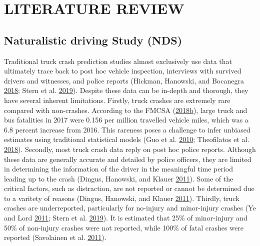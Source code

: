 \documentclass[12pt]{book}
\numberwithin{equation}{chapter}
\begin{document}
\hypertarget{literature-review}{%
\chapter{LITERATURE REVIEW}\label{literature-review}}

\hypertarget{naturalistic-driving-study-nds}{%
\section{Naturalistic driving Study (NDS)}\label{naturalistic-driving-study-nds}}

Traditional truck crash prediction studies almost exclusively use data that ultimately trace back to post hoc vehicle inspection, interviews with survived drivers and witnesses, and police reports (Hickman, Hanowski, and Bocanegra \protect\hyperlink{ref-hickman2018synthetic}{2018}; Stern et al. \protect\hyperlink{ref-stern2019data}{2019}). Despite these data can be in-depth and thorough, they have several inherent limitations. Firstly, truck crashes are extremely rare compared with non-crashes. According to the FMCSA (\protect\hyperlink{ref-fmcsareport2017}{2018}\protect\hyperlink{ref-fmcsareport2017}{b}), large truck and bus fatalities in 2017 were 0.156 per million travelled vehicle miles, which was a 6.8 percent increase from 2016. This rareness poses a challenge to infer unbiased estimates using traditional statistical models (Guo et al. \protect\hyperlink{ref-guo2010near}{2010}; Theofilatos et al. \protect\hyperlink{ref-theofilatos2018impact}{2018}). Secondly, most truck crash data reply on post hoc police reports. Although these data are generally accurate and detailed by police officers, they are limited in determining the information of the driver in the meaningful time period leading up to the crash (Dingus, Hanowski, and Klauer \protect\hyperlink{ref-dingus2011estimating}{2011}). Some of the critical factors, such as distraction, are not reported or cannot be determined due to a varitety of reasons (Dingus, Hanowski, and Klauer \protect\hyperlink{ref-dingus2011estimating}{2011}). Thirdly, truck crashes are underreported, particularly for no-injury and minor-injury crashes (Ye and Lord \protect\hyperlink{ref-ye2011investigation}{2011}; Stern et al. \protect\hyperlink{ref-stern2019data}{2019}). It is estimated that 25\% of minor-injury and 50\% of non-injury crashes were not reported, while 100\% of fatal crashes were reported (Savolainen et al. \protect\hyperlink{ref-savolainen2011statistical}{2011}).
\end{document}
